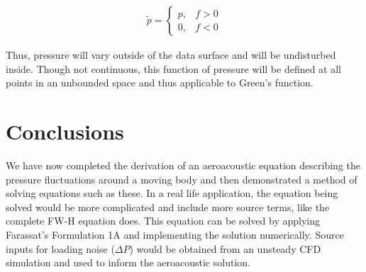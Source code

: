 \documentclass[]{aiaa-tc}%
\begin{document}
\begin{equation} \label{Ptilde}
\begin{split}
\boxed{\widetilde{p} =
    \left\{ \begin{array}{lll}
        p, & f > 0 \\
        0, & f < 0
    \end{array} \right.}
\end{split}
\end{equation}

\noindent Thus, pressure will vary outside of the data surface and will be undisturbed inside. Though not continuous, this function of pressure will be defined at all points in an unbounded space and thus applicable to Green's function.






\section{Conclusions}

We have now completed the derivation of an aeroacoustic equation describing the pressure fluctuations around a moving body and then demonstrated a method of solving equations such as these.  In a real life application, the equation being solved would be more complicated and include more source terms, like the complete FW-H equation does.  This equation can be solved by applying Farassat's Formulation 1A and implementing the solution numerically.  Source inputs for loading noise ($\Delta P$) would be obtained from an unsteady CFD simulation and used to inform the aeroacoustic solution.
\end{document}
